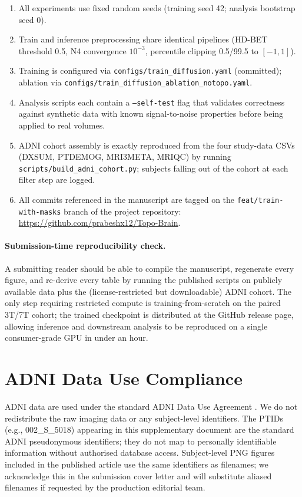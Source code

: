 \documentclass[10pt,a4paper]{article}
\begin{document}
\begin{enumerate}
\item All experiments use fixed random seeds (training seed 42;
analysis bootstrap seed 0).
\item Train and inference preprocessing share identical pipelines
(HD-BET threshold 0.5, N4 convergence $10^{-3}$, percentile clipping
0.5/99.5 to $[-1,1]$).
\item Training is configured via \texttt{configs/train\_diffusion.yaml}
(committed); ablation via
\texttt{configs/train\_diffusion\_ablation\_notopo.yaml}.
\item Analysis scripts each contain a \texttt{--self-test} flag that
validates correctness against synthetic data with known signal-to-noise
properties before being applied to real volumes.
\item ADNI cohort assembly is exactly reproduced from the four
study-data CSVs (DXSUM, PTDEMOG, MRI3META, MRIQC) by running
\texttt{scripts/build\_adni\_cohort.py}; subjects falling out of the
cohort at each filter step are logged.
\item All commits referenced in the manuscript are tagged on the
\texttt{feat/train-with-masks} branch of the project repository:
\url{https://github.com/prabeshx12/Topo-Brain}.
\end{enumerate}

\paragraph{Submission-time reproducibility check.} A submitting reader
should be able to compile the manuscript, regenerate every figure,
and re-derive every table by running the published scripts on
publicly available data plus the (license-restricted but downloadable)
ADNI cohort. The only step requiring restricted compute is
training-from-scratch on the paired 3T/7T cohort; the trained
checkpoint is distributed at the GitHub release page, allowing
inference and downstream analysis to be reproduced on a single
consumer-grade GPU in under an hour.

\section{ADNI Data Use Compliance}

ADNI data are used under the standard ADNI Data Use Agreement
\cite{petersen2010adni}. We do not redistribute the raw imaging data
or any subject-level identifiers. The PTIDs (e.g., 002\_S\_5018)
appearing in this supplementary document are the standard ADNI
pseudonymous identifiers; they do not map to personally identifiable
information without authorised database access. Subject-level PNG
figures included in the published article use the same identifiers
as filenames; we acknowledge this in the submission cover letter and
will substitute aliased filenames if requested by the production
editorial team.



\end{document}
